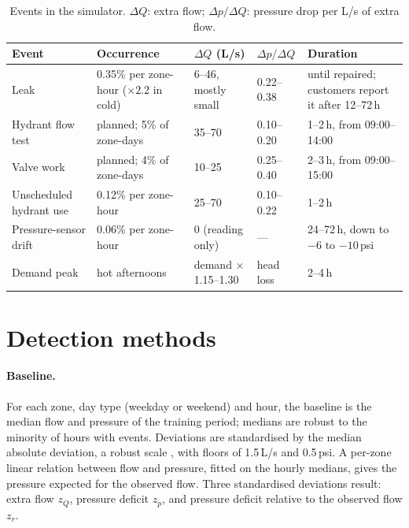 \documentclass[11pt,a4paper]{article}
\begin{document}
\begin{table}[htbp]
\centering
\small
\caption{Events in the simulator. $\Delta Q$: extra flow; $\Delta p/\Delta Q$: pressure drop per L/s of extra flow.}
\label{tab:events}
\setlength{\tabcolsep}{4pt}
\begin{tabular}{p{2.9cm}p{3.5cm}p{2.1cm}p{1.5cm}p{3.2cm}}
\toprule
Event & Occurrence & $\Delta Q$ (L/s) & $\Delta p/\Delta Q$ & Duration \\
\midrule
Leak & 0.35\% per zone-hour ($\times 2.2$ in cold) & 6--46, mostly small & 0.22--0.38 & until repaired; customers report it after 12--72\,h \\
Hydrant flow test & planned; 5\% of zone-days & 35--70 & 0.10--0.20 & 1--2\,h, from 09:00--14:00 \\
Valve work & planned; 4\% of zone-days & 10--25 & 0.25--0.40 & 2--3\,h, from 09:00--15:00 \\
Unscheduled hydrant use & 0.12\% per zone-hour & 25--70 & 0.10--0.22 & 1--2\,h \\
Pressure-sensor drift & 0.06\% per zone-hour & 0 (reading only) & --- & 24--72\,h, down to $-6$ to $-10$\,psi \\
Demand peak & hot afternoons & demand $\times$1.15--1.30 & head loss & 2--4\,h \\
\bottomrule
\end{tabular}
\end{table}

\section{Detection methods}
\label{sec:detect}

\paragraph{Baseline.} For each zone, day type (weekday or weekend) and hour, the baseline is the median flow and pressure of the training period; medians are robust to the minority of hours with events. Deviations are standardised by the median absolute deviation, a robust scale \cite{leys2013}, with floors of 1.5\,L/s and 0.5\,psi. A per-zone linear relation between flow and pressure, fitted on the hourly medians, gives the pressure expected for the observed flow. Three standardised deviations result: extra flow $z_Q$, pressure deficit $z_p$, and pressure deficit relative to the observed flow $z_r$.
\end{document}
